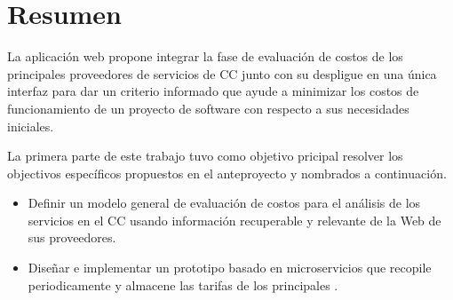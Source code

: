 

\begingroup
\let\clearpage\relax
\let\cleardoublepage\relax
\let\cleardoublepage\relax



\chapter*{Resumen}
La aplicación web \appName propone integrar la fase de evaluación de costos de los principales proveedores de servicios de \acrfull{CC} junto con su despligue en una única interfaz para dar un criterio informado que ayude a minimizar los costos de funcionamiento de un proyecto de software con respecto a sus necesidades iniciales.\bigskip

La primera parte de este trabajo tuvo como objetivo pricipal resolver los objectivos específicos propuestos en el anteproyecto y nombrados a continuación.

\begin{itemize}
    \item Definir un modelo general de evaluación de costos para el análisis de los servicios en el \acrshort{CC} usando información recuperable y relevante de la Web de sus proveedores.
    \item Diseñar e implementar un prototipo basado en microservicios que recopile periodicamente y almacene las tarifas de los principales .
\end{itemize}

\endgroup			

\vfill